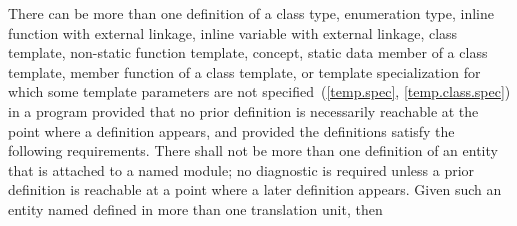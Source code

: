 \pnum
There can be more than one definition of a class type,
enumeration type, inline function
with external linkage, inline variable with external
linkage, class template,
non-static function template,
concept,
static data member of a class template, member
function of a class template, or template
specialization for which some template parameters are not
specified~(\ref{temp.spec}, \ref{temp.class.spec}) in a program
provided that
no prior definition is necessarily reachable
at the point where a definition appears, and
provided the definitions satisfy the following requirements.
There shall not be more than one definition
of an entity
that is attached to a named module;
no diagnostic is required unless a prior definition
is reachable at a point where a later definition appears.
Given such
an entity named  defined in more than one translation unit,
then
